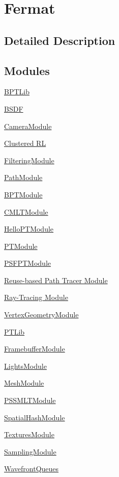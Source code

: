 \hypertarget{group___fermat}{}\section{Fermat}
\label{group___fermat}


\subsection{Detailed Description}
\subsection*{Modules}
\begin{DoxyCompactItemize}
\item 
\hyperlink{group___b_p_t_lib}{B\+P\+T\+Lib}
\item 
\hyperlink{group___b_s_d_f_module}{B\+S\+DF}
\item 
\hyperlink{group___camera_module}{Camera\+Module}
\item 
\hyperlink{group___clustered_r_l_module}{Clustered RL}
\item 
\hyperlink{group___filtering_module}{Filtering\+Module}
\item 
\hyperlink{group___path_module}{Path\+Module}
\item 
\hyperlink{group___b_p_t_module}{B\+P\+T\+Module}
\item 
\hyperlink{group___c_m_l_t_module}{C\+M\+L\+T\+Module}
\item 
\hyperlink{group___hello_p_t_module}{Hello\+P\+T\+Module}
\item 
\hyperlink{group___p_t_module}{P\+T\+Module}
\item 
\hyperlink{group___p_s_f_p_t_module}{P\+S\+F\+P\+T\+Module}
\item 
\hyperlink{group___r_p_t_module}{Reuse-\/based Path Tracer Module}
\item 
\hyperlink{group___r_t_module}{Ray-\/\+Tracing Module}
\item 
\hyperlink{group___vertex_geometry_module}{Vertex\+Geometry\+Module}
\item 
\hyperlink{group___p_t_lib}{P\+T\+Lib}
\item 
\hyperlink{group___framebuffer_module}{Framebuffer\+Module}
\item 
\hyperlink{group___lights_module}{Lights\+Module}
\item 
\hyperlink{group___mesh_module}{Mesh\+Module}
\item 
\hyperlink{group___p_s_s_m_l_t_module}{P\+S\+S\+M\+L\+T\+Module}
\item 
\hyperlink{group___spatial_hash_module}{Spatial\+Hash\+Module}
\item 
\hyperlink{group___textures_module}{Textures\+Module}
\item 
\hyperlink{group___sampling_module}{Sampling\+Module}
\item 
\hyperlink{group___wavefront_queues}{Wavefront\+Queues}
\end{DoxyCompactItemize}
